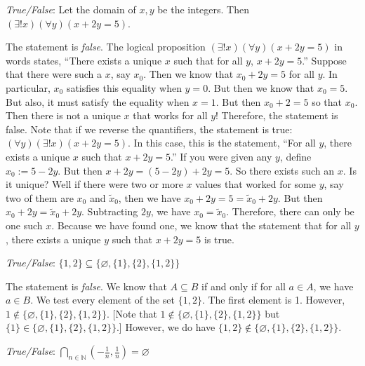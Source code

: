 \documentclass[11pt,letterpaper]{article}
\begin{document}
\quizsol \textit{True/False}: Let the domain of $x, y$ be the integers. Then $(\exists! x)(\forall y)(x + 2y= 5)$. \pspace

\sol The statement is \textit{false}. The logical proposition $(\exists! x)(\forall y)(x + 2y= 5)$ in words states, ``There exists a unique $x$ such that for all $y$, $x + 2y= 5$.'' Suppose that there were such a $x$, say $x_0$. Then we know that $x_0 + 2y= 5$ for all $y$. In particular, $x_0$ satisfies this equality when $y= 0$. But then we know that $x_0= 5$. But also, it must satisfy the equality when $x= 1$. But then $x_0 + 2= 5$ so that $x_0$. Then there is not a unique $x$ that works for all $y$! Therefore, the statement is false. Note that if we reverse the quantifiers, the statement is true: $(\forall y)(\exists! x)(x + 2y= 5)$. In this case, this is the statement, ``For all $y$, there exists a unique $x$ such that $x + 2y= 5$.'' If you were given any $y$, define $x_0:= 5 - 2y$. But then $x + 2y= (5 - 2y) + 2y= 5$. So there exists such an $x$. Is it unique? Well if there were two or more $x$ values that worked for some $y$, say two of them are $x_0$ and $\tilde{x}_0$, then we have $x_0 + 2y= 5= \tilde{x}_0 + 2y$. But then $x_0 + 2y= \tilde{x}_0 + 2y$. Subtracting $2y$, we have $x_0 = \tilde{x}_0$. Therefore, there can only be one such $x$. Because we have found one, we know that the statement that for all $y$, there exists a unique $y$ such that $x + 2y= 5$ is true. 





\newpage





\quizsol \textit{True/False}:  $\{ 1, 2 \} \subseteq \{ \varnothing, \{ 1 \}, \{ 2 \}, \{ 1, 2 \} \}$ \pspace

\sol The statement is \textit{false}. We know that $A \subseteq B$ if and only if for all $a \in A$, we have $a \in B$. We test every element of the set $\{ 1, 2 \}$. The first element is 1. However, $1 \notin \{ \varnothing, \{ 1 \}, \{ 2 \}, \{ 1, 2 \} \}$. [Note that $1 \notin \{ \varnothing, \{ 1 \}, \{ 2 \}, \{ 1, 2 \} \}$ but $\{ 1 \} \in \{ \varnothing, \{ 1 \}, \{ 2 \}, \{ 1, 2 \} \}$.] However, we do have $\{ 1, 2 \} \notin \{ \varnothing, \{ 1 \}, \{ 2 \}, \{ 1, 2 \} \}$. \pvspace{1.5cm}



\quizsol \textit{True/False}: $\displaystyle\bigcap_{n \in \mathbb{N}} \left( -\frac{1}{n}, \frac{1}{n} \right)= \varnothing$ \pspace
\end{document}
